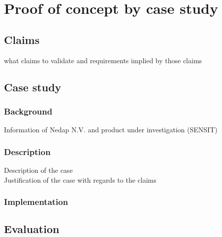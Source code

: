 \chapter{Proof of concept by case study}
\section{Claims}
what claims to validate and requirements implied by those claims
\section{Case study}
\subsection{Background}
Information of Nedap N.V. and product under investigation (SENSIT)
\subsection{Description}
Description of the case \\
Justification of the case with regards to the claims
\subsection{Implementation}
\section{Evaluation}
